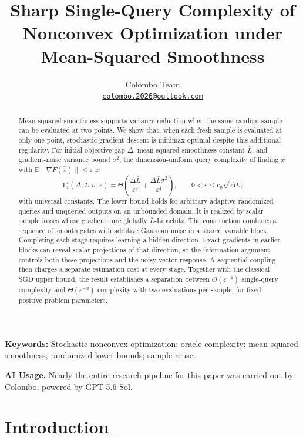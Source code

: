 \documentclass[11pt]{article}
\title{\textbf{Sharp Single-Query Complexity of Nonconvex Optimization under Mean-Squared Smoothness}}
\author{Colombo Team\\[0.4em]
\small\href{mailto:colombo.2026@outlook.com}{\texttt{colombo.2026@outlook.com}}}
\date{}
\newcommand{\E}{\mathbb E}
\newcommand{\eps}{\varepsilon}
\theoremstyle{definition}
\theoremstyle{remark}
\begin{document}
\maketitle

\begin{abstract}
Mean-squared smoothness supports variance reduction when the same random
sample can be evaluated at two points. We show that, when each fresh sample
is evaluated at only one point, stochastic gradient descent is minimax
optimal despite this additional regularity. For initial objective gap
$\Delta$, mean-squared smoothness constant $\bar L$, and gradient-noise
variance bound $\sigma^2$, the dimension-uniform query complexity of finding
$\widehat x$ with $\E\|\nabla F(\widehat x)\|\le\eps$ is
\[
 \mathsf T_1^\star(\Delta,\bar L,\sigma,\eps)
 =\Theta\!\left(
   \frac{\Delta\bar L}{\eps^2}
   +\frac{\Delta\bar L\sigma^2}{\eps^4}
 \right),
 \qquad 0<\eps\le c_0\sqrt{\Delta\bar L},
\]
with universal constants. The lower bound holds for arbitrary adaptive
randomized queries and unqueried outputs on an unbounded domain. It is
realized by scalar sample losses whose gradients are globally
$\bar L$-Lipschitz. The construction combines a sequence of smooth gates
with additive Gaussian noise in a shared variable block. Completing each
stage requires learning a hidden direction. Exact gradients in earlier
blocks can reveal scalar projections of that direction, so the information
argument controls both these projections and the noisy vector response.
A sequential coupling then charges a separate estimation cost at every
stage. Together with the classical SGD upper bound, the result establishes
a separation between $\Theta(\eps^{-4})$ single-query complexity and
$\Theta(\eps^{-3})$ complexity with two evaluations per sample, for fixed
positive problem parameters.
\end{abstract}

\noindent\textbf{Keywords:} Stochastic nonconvex optimization; oracle
complexity; mean-squared smoothness; randomized lower bounds; sample reuse.
\par\medskip
\begin{samepage}
\noindent\textbf{AI Usage.}
Nearly the entire research pipeline for this paper was carried out by
Colombo, powered by GPT-5.6 Sol.
\par
\end{samepage}

\section{Introduction}\label{sec:intro}
\end{document}
